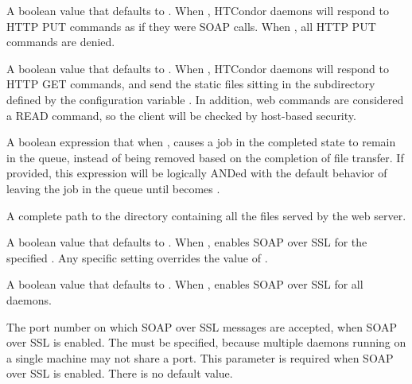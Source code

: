\begin{description}

\label{param:EnableSoap}
\item[\Macro{ENABLE\_SOAP}]
  A boolean value that defaults to .
  When , HTCondor daemons will respond to HTTP PUT commands
  as if they were SOAP calls. When ,
  all HTTP PUT commands are denied.

\label{param:EnableWebServer}
\item[\Macro{ENABLE\_WEB\_SERVER}]
  A boolean value that defaults to .
  When , HTCondor daemons will respond to HTTP GET commands,
  and send the static files sitting in the subdirectory defined
  by the configuration variable .
  In addition, web commands are considered a READ command,
  so the client will be checked by host-based security.

\label{param:SoapLeaveInQueue}
\item[\Macro{SOAP\_LEAVE\_IN\_QUEUE}]
  A boolean expression that when ,
  causes a job in the completed state to remain in the queue,
  instead of being removed based on the completion of file transfer.
  If provided, this expression will be logically ANDed with the
  default behavior of leaving the job in the queue until 
  becomes .

\label{param:WebRootDir}
\item[\Macro{WEB\_ROOT\_DIR}]
  A complete path to the directory containing all the files served
  by the web server.

\label{param:SubsysEnableSoapSSL}
\item[\MacroB{<SUBSYS>\_ENABLE\_SOAP\_SSL}]
  A boolean value that defaults to .
  When , enables SOAP over SSL for the specified
  .
  Any specific  setting overrides
  the value of .

\label{param:EnableSoapSSL}
\item[\Macro{ENABLE\_SOAP\_SSL}]
  A boolean value that defaults to .
  When , enables SOAP over SSL for all daemons.

\label{param:SubsysSoapSSLPort}
\item[\MacroB{<SUBSYS>\_SOAP\_SSL\_PORT}]
  The port number on which SOAP over SSL messages are
  accepted, when SOAP over SSL is enabled.
  The  must be specified, because multiple daemons
  running on a single machine may not share a port.
  This parameter is required when SOAP over SSL is enabled.
  There is no default value.


\end{description}
